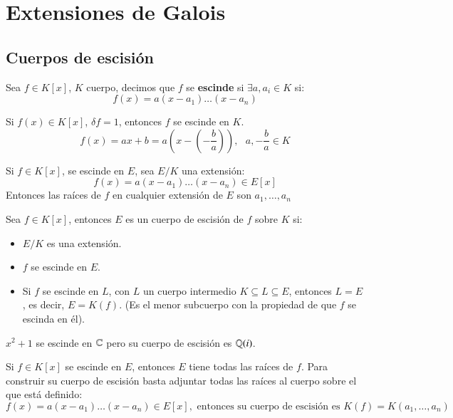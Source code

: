 
\chapter{Extensiones de Galois}

\section{Cuerpos de escisión}

\begin{dfn}
    Sea $f \in K[x]$, $K$ cuerpo, decimos que $f$ se \textbf{escinde} si $\exists a, a_i\in K$ si:
    $$
        f(x) = a(x - a_1) \ldots (x - a_n)
    $$
\end{dfn}

\begin{obs}
    Si $f(x) \in K[x]$, $\delta f = 1$, entonces $f$ se escinde en $K$.
    $$
        f(x) = ax + b = a \left(x - \left(- \frac{b}{a}\right)\right),\ \ \ a, -\frac{b}{a} \in K
    $$
\end{obs}

\begin{obs}
    Si $f \in K[x]$, se escinde en $E$, sea $E/K$ una extensión:
    $$
        f(x) = a (x - a_1) \ldots (x - a_n) \in E[x]
    $$
    Entonces las raíces de $f$ en cualquier extensión de $E$ son $a_1, \ldots, a_n$
\end{obs}

\begin{dfn}
Sea $f \in K[x]$, entonces $E$ es un cuerpo de escisión de $f$ sobre $K$ si:
    \begin{itemize}
        \item $E/K$ es una extensión.
        \item $f$ se escinde en $E$.
        \item Si $f$ se escinde en $L$, con $L$ un cuerpo intermedio $K \subseteq L \subseteq E$, entonces $L=E$, es decir, $E = K(f)$. (Es el menor subcuerpo con la propiedad de que $f$ se escinda en él).
    \end{itemize}
\end{dfn}

\begin{eg}
    $x^2 + 1$ se escinde en $\mathbb{C}$ pero su cuerpo de escisión es $\mathbb{Q}(i)$.
\end{eg}

\begin{obs}
    Si $f \in K[x]$ se escinde en $E$, entonces $E$ tiene todas las raíces de $f$. Para construir su cuerpo de escisión basta adjuntar todas las raíces al cuerpo sobre el que está definido:
    $$
        f(x) = a (x - a_1) \ldots (x - a_n) \in E[x], \text{ entonces su cuerpo de escisión es } K(f) = K(a_1, \ldots, a_n)
    $$
\end{obs}

